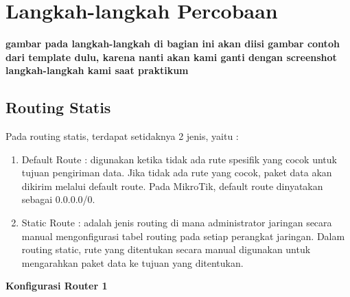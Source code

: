 \section{Langkah-langkah Percobaan}
\textbf{gambar pada langkah-langkah di bagian ini akan diisi gambar contoh dari template dulu,
		karena nanti akan kami ganti dengan screenshot langkah-langkah kami saat praktikum}

\subsection{Routing Statis}
Pada routing statis, terdapat setidaknya 2 jenis, yaitu :
\begin{enumerate}
	\item Default Route : digunakan ketika tidak ada rute spesifik yang cocok untuk tujuan pengiriman data. Jika tidak ada rute yang cocok, paket data akan dikirim melalui default route. Pada MikroTik,
	default route dinyatakan sebagai 0.0.0.0/0.
	\item Static Route : adalah jenis routing di mana administrator jaringan secara manual mengonfigurasi
	tabel routing pada setiap perangkat jaringan. Dalam routing static, rute yang ditentukan secara
	manual digunakan untuk mengarahkan paket data ke tujuan yang ditentukan.
\end{enumerate}

\begin{center} 
	\textbf{Konfigurasi Router 1}
\end{center}

